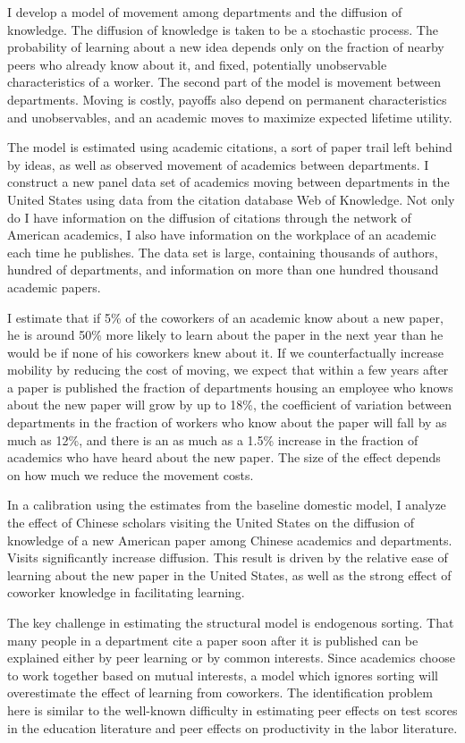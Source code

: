 \documentclass[]{article}
\begin{document}
I develop a model of movement among departments and the diffusion
of knowledge. The diffusion of knowledge is taken to be a stochastic
process. The probability of learning about a new idea depends only on
the fraction of nearby peers who already know about it, and fixed,
potentially unobservable characteristics of a worker. The second part of
the model is movement between departments. Moving is costly, payoffs also depend on permanent characteristics
and unobservables, and an academic moves to maximize expected lifetime utility.

The model is estimated using academic citations, a sort of paper trail
left behind by ideas, as well as observed movement of academics between
departments. I construct a new panel data set of academics moving between
departments in the United States using data from the citation database Web of
Knowledge. Not only do I have information on the diffusion of citations
through the network of American academics, I also have information on the
workplace of an academic each time he publishes. The data set is large,
containing thousands of authors, hundred of departments, and information
on more than one hundred thousand academic papers.

I estimate that if 5\% of the coworkers of an academic know about a new paper,
he is around 50\% more likely to learn about the paper in the next year than he would be if
none of his coworkers knew about it.  If we counterfactually increase mobility
by reducing the cost of moving, we expect that within a few years after a paper is published the fraction of departments
housing an employee who knows about the new paper will grow by up to 18\%, the coefficient of variation between departments in the
fraction of workers who know about the paper will fall by as much as 12\%, and there is an as much as a 1.5\% increase in the fraction 
of academics who have heard about the new paper.  The size of the effect depends on how much we reduce the
movement costs.

In a calibration using the estimates from the baseline domestic model, I analyze the
effect of Chinese scholars visiting the United States on the diffusion of knowledge of a new
American paper among Chinese academics and departments.  Visits significantly increase diffusion.
This result is driven by the relative ease of learning about the new paper in the United States, as well as 
the strong effect of coworker knowledge in facilitating learning.

The key challenge in estimating the structural model is endogenous sorting. That many people in a department 
cite a paper soon after it is published can be explained either by peer learning or by common interests.
Since academics choose to work together based on mutual interests, a model 
which ignores sorting will overestimate the effect of learning from coworkers.  The identification
problem here is similar to the well-known difficulty in estimating peer
effects on test scores in the education literature and peer effects on
productivity in the labor literature.
\end{document}
